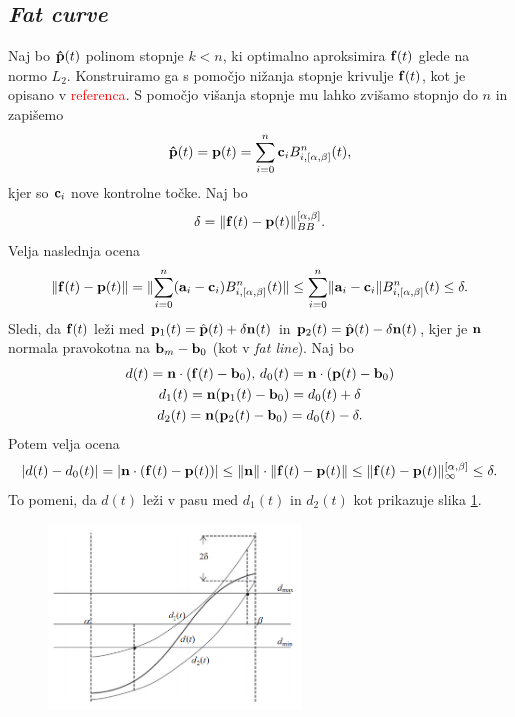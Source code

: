 
\subsection{\em Fat curve}
Naj bo ${\bf \hat{p}}(t)$ polinom stopnje $k < n$, ki optimalno aproksimira ${\bf f}(t)$ glede na normo $L_2$. Konstruiramo ga s pomočjo nižanja stopnje krivulje ${\bf f}(t)$, kot je opisano v \textcolor{red}{referenca}. S pomočjo višanja stopnje mu lahko zvišamo stopnjo do $n$ in zapišemo
$$
{\bf \hat{p}}(t) = {\bf p}(t) = \sum _{i=0}^n {\bf c}_iB_{i,[\alpha,\beta]}^n(t),
$$
kjer so ${\bf c}_i$ nove kontrolne točke. Naj bo 
\begin{equation}\label{def_delta}
\delta = \lVert {\bf f}(t) - {\bf p}(t) \rVert _{BB}^{[\alpha,\beta]}.
\end{equation}
Velja naslednja ocena
$$
\lVert {\bf f}(t) - {\bf p}(t) \rVert = \lVert \sum _{i=0}^n({\bf a}_i-{\bf c}_i)B_{i,[\alpha,\beta]}^n(t) \rVert
\leq \sum _{i=0}^n\lVert{\bf a}_i-{\bf c}_i\rVert B_{i,[\alpha,\beta]}^n(t) \leq \delta.
$$
Sledi, da ${\bf f}(t)$ leži med ${\bf p}_1(t) = \hat{{\bf p}}(t) + \delta {\bf n}(t)$ in ${\bf p}_2(t) = \hat{{\bf p}}(t) - \delta {\bf n}(t)$, kjer je ${\bf n}$ normala pravokotna na ${\bf b}_m - {\bf b}_0$ (kot v {\em fat line}). Naj bo
\begin{gather*}
d(t) = {\bf n}\cdot({\bf f}(t) - {\bf b}_0), \, d_0(t)= {\bf n}\cdot ({\bf p}(t) - {\bf b}_0)\\
d_1(t) = {\bf n} ({\bf p}_1(t) - {\bf b}_0) = d_0(t) + \delta \\
d_2(t) = {\bf n} ({\bf p}_2(t) - {\bf b}_0) = d_0(t) - \delta.
\end{gather*}
Potem velja ocena
$$
|d(t)-d_0(t)|=|{\bf n}\cdot({\bf f}(t)-{\bf p}(t))|\leq \lVert {\bf n}\rVert\cdot \lVert {\bf f}(t) - {\bf p}(t) \rVert \leq \lVert {\bf f}(t) - {\bf p}(t) \rVert _{\infty}^{[\alpha,\beta]} \leq \delta.
$$
To pomeni, da $d(t)$ leži v pasu med $d_1(t)$ in $d_2(t)$ kot prikazuje slika \ref{slika4}.
\begin{figure}[!h]
    \centering 
    \includegraphics[width=0.6\textwidth]{dist}
    \caption{}
  	\label{slika4}
\end{figure}